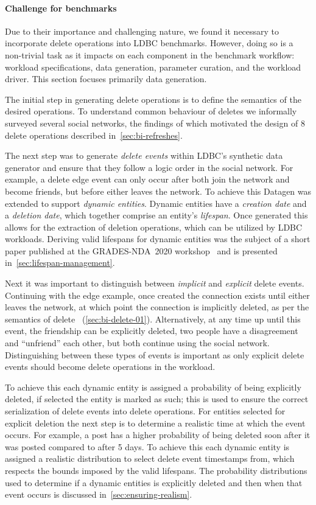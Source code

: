 \paragraph{Challenge for benchmarks}
Due to their importance and challenging nature, we found it necessary to incorporate delete operations into LDBC benchmarks.
However, doing so is a non-trivial task as it impacts on each component in the benchmark workflow:
workload specifications, data generation, parameter curation, and the workload driver.
This section focuses primarily data generation.

The initial step in generating delete operations is to define the semantics of the desired operations.
To understand common behaviour of deletes we informally surveyed several social networks, the findings of which motivated the design
of 8 delete operations described in~\autoref{sec:bi-refreshes}.

The next step was to generate \emph{delete events} within LDBC's synthetic data generator and ensure that they follow a logic order in
the social network.
For example, a delete \tKnows edge event can only occur after both \tPersons join the network and become friends,
but before either \tPerson leaves the network.
To achieve this Datagen was extended to support \emph{dynamic entities}.
Dynamic entities have a \emph{creation date} and a \emph{deletion date}, which together comprise an entity's \emph{lifespan}.
Once generated this allows for the extraction of deletion operations, which can be utilized by LDBC workloads.
Deriving valid lifespans for dynamic entities was the subject of a short paper published at the GRADES-NDA~2020
workshop~\cite{DBLP:conf/sigmod/WaudbySPS20} and is presented in~\autoref{sec:lifespan-management}.

Next it was important to distinguish between \emph{implicit} and \emph{explicit} delete events.
Continuing with the \tKnows edge example, once created the connection exists until either \tPerson leaves the network,
at which point the connection is implicitly deleted, as per the semantics of delete \tPerson~(\autoref{sec:bi-delete-01}).
Alternatively, at any time up until this event, the friendship can be explicitly deleted,
\ie two people have a disagreement and ``unfriend'' each other, but both continue using the social network.
Distinguishing between these types of events is important as only explicit delete events should become delete operations
in the workload.

To achieve this each dynamic entity is assigned a probability of being explicitly deleted, if selected the entity is marked as such;
this is used to ensure the correct serialization of delete events into delete operations.
For entities selected for explicit deletion the next step is to determine a realistic time at which the event occurs.
For example, a post has a higher probability of being deleted soon after it was posted compared to after 5 days.
To achieve this each dynamic entity is assigned a realistic distribution to select delete event timestamps from,
which respects the bounds imposed by the valid lifespans.
The probability distributions used to determine if a dynamic entities is explicitly deleted and then when that event occurs is discussed
in~\autoref{sec:ensuring-realism}.

